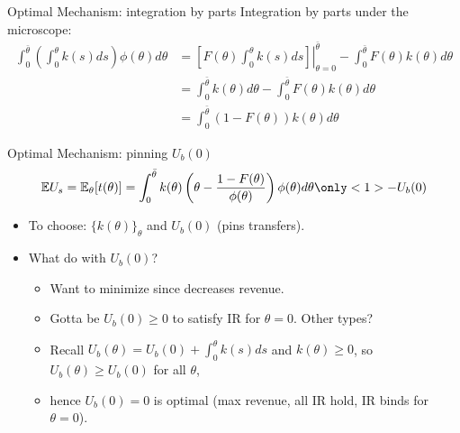 \documentclass[english,10pt
,aspectratio=169
]{beamer}
\begin{document}
\begin{frame}{Optimal Mechanism: integration by parts}
Integration by parts under the microscope:
\begin{align*}
	\int_0^{\bar{\theta}} \left( \int_0^\theta k(s) ds \right) \phi(\theta) d\theta &= \left. \left[F(\theta) \int_0^\theta k(s) ds \right] \right|_{\theta=0}^{\bar{\theta}} - \int_0^{\bar{\theta}} F(\theta) k(\theta) d\theta
	\\ &= \int_0^{\bar{\theta}} k(\theta) d\theta - \int_0^{\bar{\theta}} F(\theta) k(\theta) d\theta
	\\ &= \int_0^{\bar{\theta}} (1-F(\theta)) k(\theta) d\theta
\end{align*}
\end{frame}


\begin{frame}{Optimal Mechanism: pinning $U_b(0)$}
\begin{equation*}
	\mathbb{E} U_s = \mathbb{E}_\theta [ t(\theta) ] = \int_0^{\bar{\theta}} k(\theta) \left( \theta - \frac{1-F(\theta)}{\phi(\theta)} \right) \phi(\theta) d\theta \only<1>{- U_b(0)} %
\end{equation*}
\begin{itemize}
	\item To choose: $\{k(\theta)\}_\theta$ and $U_b(0)$ (pins transfers).
	\pause
	\item What do with $U_b(0)$?
	\begin{itemize}
		\item Want to minimize since decreases revenue.
		\item Gotta be $U_b(0) \geq 0$ to satisfy IR for $\theta = 0$. Other types?
		\pause
		\item Recall $U_b(\theta) = U_b(0) + \int_0^\theta k(s) ds$ and $k(\theta) \geq 0$, so $U_b(\theta)\geq U_b(0)$ for all $\theta$, 
		\item hence $U_b(0) = 0$ is optimal (max revenue, all IR hold, IR binds for $\theta=0$).
	\end{itemize}
\end{itemize}
\end{frame}
\end{document}

